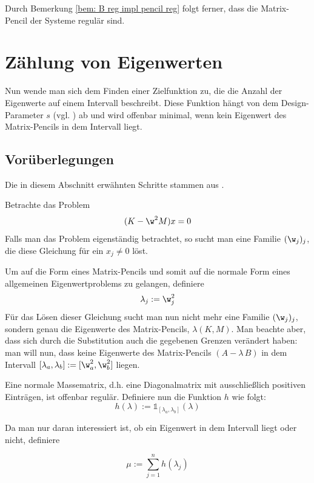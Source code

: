 \documentclass[a4paper,12pt]{report}
\newcommand{\AlamB}{A-\lambda\,B}
\newcommand{\1}{\mathds{1}}
\theoremstyle{plain} %
\theoremstyle{definition} %
\theoremstyle{remark}
\begin{document}
            Durch Bemerkung \ref{bem: B reg impl pencil reg} folgt ferner, dass die Matrix-Pencil der Systeme regulär sind.

\chapter{Zählung von Eigenwerten}
\label{sec: EW Zählung}
      Nun wende man sich dem Finden einer Zielfunktion zu, die die Anzahl der Eigenwerte auf einem Intervall beschreibt.
      Diese Funktion hängt von dem Design-Parameter $s$ (vgl. \cite[S. 2]{hauptteilTkachuk}) ab und wird offenbar minimal, wenn kein Eigenwert des Matrix-Pencils in dem Intervall liegt.
      
      \section{Vorüberlegungen}
            Die in diesem Abschnitt erwähnten Schritte stammen aus \cite[S. 2-4]{hauptteilTkachuk}.

            Betrachte das Problem
            $$(K-\w^2 M)x = 0$$
            Falls man das Problem eigenständig betrachtet, so sucht man eine Familie $(\w_j)_j$, die diese Gleichung für ein $x_j \ne 0$ löst.

            Um auf die Form eines Matrix-Pencils und somit auf die normale Form eines allgemeinen Eigenwertproblems zu gelangen, definiere
            $$\lambda_j := \w_j^2$$
            Für das Lösen dieser Gleichung sucht man nun nicht mehr eine Familie $(\w_j)_j$, sondern genau die Eigenwerte des Matrix-Pencils, $\lambda(K,M)$.
            Man beachte aber, dass sich durch die Substitution auch die gegebenen Grenzen verändert haben:
            man will nun, dass keine Eigenwerte des Matrix-Pencils $(\AlamB)$ in dem Intervall $[\lambda_a, \lambda_b]:=[\w_a^2,\w^2_b]$ liegen.

            Eine normale Massematrix, d.h. eine Diagonalmatrix mit ausschließlich positiven Einträgen, ist offenbar regulär.
            Definiere nun die Funktion $h$ wie folgt:
            $$h(\lambda):=\1_{[\lambda_a,\lambda_b]}(\lambda)$$

            Da man nur daran interessiert ist, ob ein Eigenwert in dem Intervall liegt oder nicht, definiere

            $$\mu := \sum_{j=1}^{n} h(\lambda_j)$$
\end{document}
